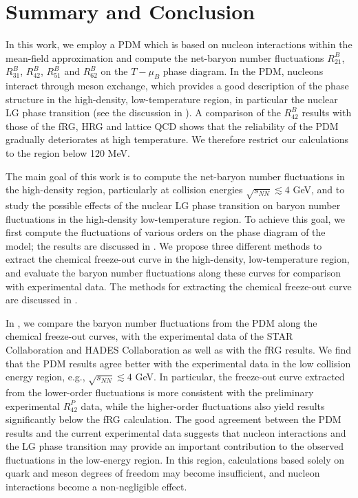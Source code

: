 \documentclass[aps,twocolumn,prd,superscriptaddress,nofootinbib,floatfix]{revtex4-2}
\begin{document}
\section{Summary and Conclusion}
\label{sec:summary}
In this work, we employ a PDM which is based on nucleon interactions within the mean-field approximation and compute the net-baryon number fluctuations $R^B_{21}$, $R^B_{31}$, $R^B_{42}$, $R^B_{51}$ and $R^B_{62}$ on the $T-\mu_B$ phase diagram. In the PDM, nucleons interact through meson exchange, which provides a good description of the phase structure in the high-density, low-temperature region, in particular the nuclear LG phase transition (see the discussion in ). A comparison of the $R^B_{42}$ results with those of the fRG, HRG and lattice QCD shows that the reliability of the PDM gradually deteriorates at high temperature. We therefore restrict our calculations to the region below 120 MeV.

The main goal of this work is to compute the net-baryon number fluctuations in the high-density region, particularly at collision energies $\sqrt{s_{NN}}\lesssim 4$ GeV, and to study the possible effects of the nuclear LG phase transition on baryon number fluctuations in the high-density low-temperature region. To achieve this goal, we first compute the fluctuations of various orders on the phase diagram of the model; the results are discussed in . We propose three different methods to extract the chemical freeze-out curve in the high-density, low-temperature region, and evaluate the baryon number fluctuations along these curves for comparison with experimental data. The methods for extracting the chemical freeze-out curve are discussed in .

In , we compare the baryon number fluctuations from the PDM along the chemical freeze-out curves, with the experimental data of the STAR Collaboration and HADES Collaboration as well as with the fRG results. We find that the PDM results agree better with the experimental data in the low collision energy region, e.g., $\sqrt{s_{NN}}\lesssim 4$ GeV. In particular, the freeze-out curve extracted from the lower-order fluctuations is more consistent with the preliminary experimental $R^P_{42}$ data, while the higher-order fluctuations also yield results significantly below the fRG calculation. The good agreement between the PDM results and the current experimental data suggests that nucleon interactions and the LG phase transition may provide an important contribution to the observed fluctuations in the low-energy region. In this region, calculations based solely on quark and meson degrees of freedom may become insufficient, and nucleon interactions become a non-negligible effect.
\end{document}
